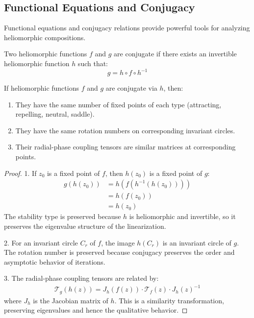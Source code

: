 \begin{definition}
\begin{enumerate}
\begin{definition}
\begin{definition}
\section{Functional Equations and Conjugacy}

Functional equations and conjugacy relations provide powerful tools for analyzing heliomorphic compositions.

\begin{definition}
Two heliomorphic functions $f$ and $g$ are conjugate if there exists an invertible heliomorphic function $h$ such that:
\begin{equation}
g = h \circ f \circ h^{-1}
\end{equation}
\end{definition}

\begin{theorem}
If heliomorphic functions $f$ and $g$ are conjugate via $h$, then:
\begin{enumerate}
    \item They have the same number of fixed points of each type (attracting, repelling, neutral, saddle).
    \item They have the same rotation numbers on corresponding invariant circles.
    \item Their radial-phase coupling tensors are similar matrices at corresponding points.
\end{enumerate}
\end{theorem}

\begin{proof}
1. If $z_0$ is a fixed point of $f$, then $h(z_0)$ is a fixed point of $g$:
\begin{align}
g(h(z_0)) &= h(f(h^{-1}(h(z_0))))\\
&= h(f(z_0))\\
&= h(z_0)
\end{align}
The stability type is preserved because $h$ is heliomorphic and invertible, so it preserves the eigenvalue structure of the linearization.

2. For an invariant circle $C_r$ of $f$, the image $h(C_r)$ is an invariant circle of $g$. The rotation number is preserved because conjugacy preserves the order and asymptotic behavior of iterations.

3. The radial-phase coupling tensors are related by:
\begin{align}
\mathcal{T}_g(h(z)) = J_h(f(z)) \cdot \mathcal{T}_f(z) \cdot J_h(z)^{-1}
\end{align}
where $J_h$ is the Jacobian matrix of $h$. This is a similarity transformation, preserving eigenvalues and hence the qualitative behavior.
\end{proof}


\end{definition}
\end{definition}
\end{enumerate}
\end{definition}
